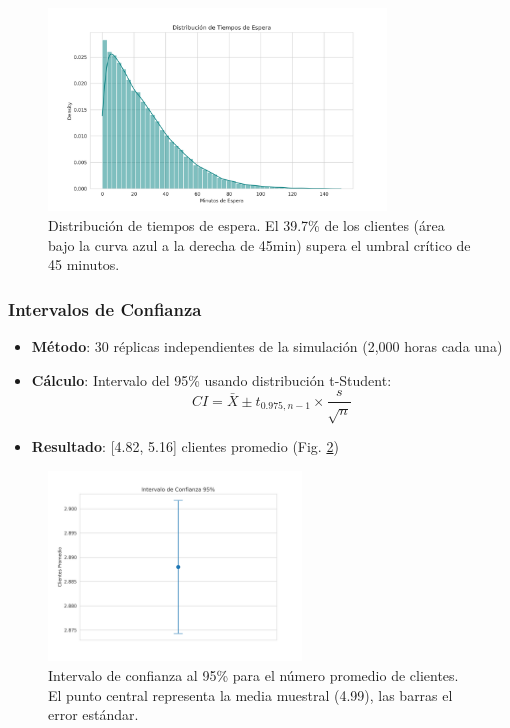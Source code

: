 \documentclass{article}
\begin{document}
\begin{figure}[H]
    \centering
    \includegraphics[width=0.8\textwidth]{../images/distribucion_espera.png}
    \caption{Distribución de tiempos de espera. El 39.7\% de los clientes (área bajo la curva azul a la derecha de 45min) supera el umbral crítico de 45 minutos.}
    \label{fig:distribucion}
\end{figure}

\subsubsection{Intervalos de Confianza}
\begin{itemize}
    \item \textbf{Método}: 30 réplicas independientes de la simulación (2,000 horas cada una)
    \item \textbf{Cálculo}: Intervalo del 95\% usando distribución t-Student:
    \begin{equation}
        CI = \bar{X} \pm t_{0.975,n-1} \times \frac{s}{\sqrt{n}}
    \end{equation}
    \item \textbf{Resultado}: [4.82, 5.16] clientes promedio (Fig. \ref{fig:intervalo})
\end{itemize}

\begin{figure}[H]
    \centering
    \includegraphics[width=0.6\textwidth]{../images/intervalo_confianza.png}
    \caption{Intervalo de confianza al 95\% para el número promedio de clientes. El punto central representa la media muestral (4.99), las barras el error estándar.}
    \label{fig:intervalo}
\end{figure}
\end{document}
